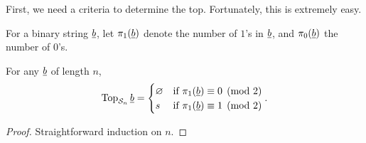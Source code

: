 First, we need a criteria to determine the top.  Fortunately, this is extremely easy.
\begin{definition*}
	For a binary string $\underline{b}$, let $\pi_1(\underline{b})$ denote the number of $1$'s in $\underline{b}$, and $\pi_0(\underline{b})$ the number of $0$'s.
\end{definition*}
\begin{proposition}
	For any $\underline{b}$ of length $n$, \[
		\operatorname{Top}_{\mathcal S_n} \underline{b} =
		\begin{cases}
			\varnothing & \text{if } \pi_1(\underline{b}) \equiv 0 \pmod{2} \\
			s & \text{if } \pi_1(\underline{b}) \equiv 1 \pmod{2} \\
		\end{cases}.
		\]
	\label{prop:s_top}
\end{proposition}
\begin{proof}
	Straightforward induction on $n$.  
\end{proof}

